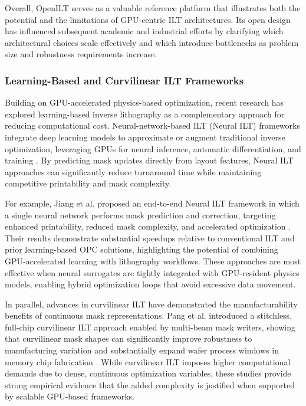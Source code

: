 \documentclass[pdflatex,sn-mathphys-num]{sn-jnl}%
\theoremstyle{thmstyleone}%
\theoremstyle{thmstyletwo}%
\theoremstyle{thmstylethree}%
\begin{document}
Overall, OpenILT serves as a valuable reference platform that illustrates both the potential and the limitations of GPU-centric ILT architectures. Its open design has influenced subsequent academic and industrial efforts by clarifying which architectural choices scale effectively and which introduce bottlenecks as problem size and robustness requirements increase.

\subsubsection{Learning-Based and Curvilinear ILT Frameworks}
Building on GPU-accelerated physics-based optimization, recent research has explored learning-based inverse lithography as a complementary approach for reducing computational cost. Neural-network-based ILT (Neural ILT) frameworks integrate deep learning models to approximate or augment traditional inverse optimization, leveraging GPUs for neural inference, automatic differentiation, and training \cite{jiang2021neural}. By predicting mask updates directly from layout features, Neural ILT approaches can significantly reduce turnaround time while maintaining competitive printability and mask complexity.

For example, Jiang et al. proposed an end-to-end Neural ILT framework in which a single neural network performs mask prediction and correction, targeting enhanced printability, reduced mask complexity, and accelerated optimization \cite{jiang2021neural}. Their results demonstrate substantial speedups relative to conventional ILT and prior learning-based OPC solutions, highlighting the potential of combining GPU-accelerated learning with lithography workflows. These approaches are most effective when neural surrogates are tightly integrated with GPU-resident physics models, enabling hybrid optimization loops that avoid excessive data movement.

In parallel, advances in curvilinear ILT have demonstrated the manufacturability benefits of continuous mask representations. Pang et al. introduced a stitchless, full-chip curvilinear ILT approach enabled by multi-beam mask writers, showing that curvilinear mask shapes can significantly improve robustness to manufacturing variation and substantially expand wafer process windows in memory chip fabrication \cite{pang2021breakthrough}. While curvilinear ILT imposes higher computational demands due to dense, continuous optimization variables, these studies provide strong empirical evidence that the added complexity is justified when supported by scalable GPU-based frameworks.
\end{document}
